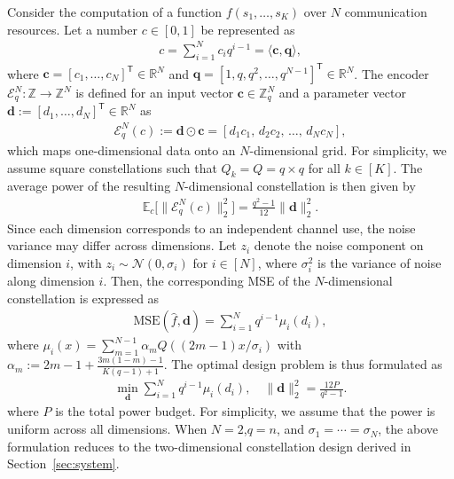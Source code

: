 \documentclass[journal,12pt,onecolumn,draftclsnofoot]{IEEEtran}
\theoremstyle{definition}
\begin{document}
Consider the computation of a function $f(s_1, \ldots, s_K)$ over $N$ communication resources. 
Let a number $c \in [0,1]$ be represented as
\begin{align}
    c = \sum_{i=1}^{N} c_i q^{i-1} = \langle \bm{c}, \bm{q} \rangle,
\end{align}
where $\bm{c} = [c_1, \ldots, c_N]^{\mathsf{T}} \in \mathbb{R}^{N}$ and $\bm{q} = [1, q, q^2, \ldots, q^{N-1}]^{\mathsf{T}} \in \mathbb{R}^{N}$. 
The encoder $\mathscr{E}_q^N : \mathbb{Z} \to \mathbb{Z}^N$ is defined for an input vector $\bm{c} \in \mathbb{Z}_q^N$ and a parameter vector $\bm{d} := [d_1,\ldots, d_N]^{\mathsf{T}}\in \mathbb{R}^N$ as
\begin{align}
\mathscr{E}_q^N(c) := \bm{d} \odot \bm{c} = [d_1 c_1,\, d_2 c_2,\, \ldots,\, d_N c_N],
\end{align}
which maps one-dimensional data onto an $N$-dimensional grid. 
For simplicity, we assume square constellations such that $Q_k = Q = q \times q$ for all $k \in [K]$.  The average power of the resulting $N$-dimensional constellation is then given by
\begin{align}
  \mathbb{E}_{c}\big[  \|\mathscr{E}_q^N(c)\|_2^2] = \frac{q^2 - 1}{12} \|\bm{d}\|_2^2.
\end{align}
Since each dimension corresponds to an independent channel use, the noise variance may differ across dimensions. Let \( z_i \) denote the noise component on dimension \( i \), with \( z_i \sim \mathcal{N}(0, \sigma_i) \) for \( i \in [N] \), where $\sigma_i^2$ is the variance of noise along dimension $i$. Then,  the corresponding MSE of the $N$-dimensional constellation is expressed as
\begin{align}
\label{eq:MSEboundN}
    \text{MSE}(\hat{f}, \bm{d}) = \sum_{i=1}^{N} q^{i-1} \mu_i(d_i), 
\end{align}
where $\mu_i(x) = \sum_{m=1}^{N-1} \alpha_m Q((2m-1)x/ \sigma_i)$ with $\alpha_m := 2m -1 + \frac{3m(1-m)-1}{K(q - 1) + 1}$.  The optimal design problem is thus formulated as
\begin{align}
\label{eq:OptmialMSEgeneralN}
    \min_{\bm{d}} \sum_{i=1}^{N} q^{i-1} \mu_i(d_i), \quad \|\bm{d}\|_2^2 = \frac{12P}{q^2 - 1}.
\end{align}
where $P$ is the total power budget. For simplicity, we assume that the power is uniform across all dimensions. When \( N = 2 \),\( q = n \), and $\sigma_1=\cdots=\sigma_N$, the above formulation reduces to the two-dimensional constellation design derived in Section~\ref{sec:system}. 
\end{document}
